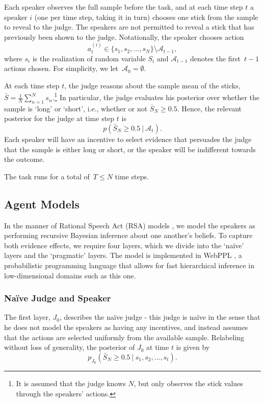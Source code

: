 \documentclass[10pt,letterpaper]{article}
\begin{document}
Each speaker observes the full sample before the task, and at each time step $t$ a speaker
$i$ (one per time step, taking it in turn) chooses one stick from the sample to reveal
to the judge. The speakers are not permitted to reveal a stick that has previously been shown to 
the judge. Notationally, the speaker chooses action 
\begin{equation}
a_t^{(i)} \in \{s_1, s_2, ..., s_N\} \setminus \mathcal{A}_{t-1},
\end{equation}
where $s_i$ is the realization of random variable $S_i$ and $\mathcal{A}_{t-1}$ denotes the first~${t-1}$ 
actions chosen. For simplicity, we let~${\mathcal{A}_0 = \emptyset}$.

At each time step $t$, the judge reasons about the sample mean of the sticks,~${\bar{S} = \frac{1}{N} \sum_{n=1}^N s_n}$.\footnote{It is assumed that the judge knows $N$, but only observes the stick values through the speakers' actions.}
In particular, the judge evaluates his posterior over whether the sample is `long' or `short', i.e., whether or not
$\bar{S	}_N \ge 0.5$. Hence, the relevant posterior for the judge at time step $t$ is
\begin{equation}
p( \bar{S}_N \ge 0.5 \ | \ \mathcal{A}_t ).
\end{equation}
Each speaker will have an incentive to select evidence that persuades the judge that the sample is
either long or short, or the speaker will be indifferent towards the outcome.

The task runs for a total of~${T\le N}$ time steps.

\subsection{Agent Models}
In the manner of Rational Speech Act (RSA) models \cite{goodman_pragmatic_2016}, we model the speakers as performing
recursive Bayesian inference about one another's beliefs. To capture both evidence effects,
we require four layers, which we divide into the `na\"ive' layers and the `pragmatic' layers.
The model is implemented in WebPPL \cite{dippl}, a probabilistic programming language that allows for
fast hierarchical inference in low-dimensional domains such as this one.

\subsubsection{Na\"ive Judge and Speaker}
The first layer, $J_0$, describes the na\"ive judge - this judge is na\"ive in the sense that he
does not model the speakers as having any incentives, and instead assumes that the actions are selected
uniformly from the available sample. Relabeling without loss of generality, the posterior of $J_0$ at time $t$ is given by
\begin{equation}
p_{J_0}( \bar{S}_N \ge 0.5 \ | \ s_1, s_2, ..., s_t).
\end{equation}
\end{document}
